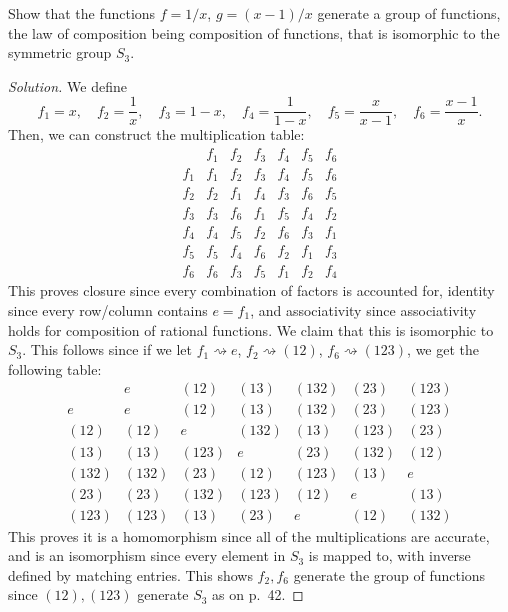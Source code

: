 \documentclass[12pt]{article}
\theoremstyle{remark}
\begin{document}
\begin{problem}
  Show that the functions $f = 1/x$, $g = (x-1)/x$ generate a group of functions, the law of composition being composition of functions, that is isomorphic to the symmetric group $S_3$.
\end{problem}
\begin{proof}[Solution]
  We define
  \begin{equation*}
    f_1 = x, \quad f_2 = \frac{1}{x}, \quad f_3 = 1 - x, \quad f_4 = \frac{1}{1-x}, \quad f_5 = \frac{x}{x-1}, \quad f_6 = \frac{x-1}{x}.
  \end{equation*}
  Then, we can construct the multiplication table:
  \begin{equation*}
    \begin{array}{c|cccccc}
          & f_1 & f_2 & f_3 & f_4 & f_5 & f_6\\
      \hline
      f_1 & f_1 & f_2 & f_3 & f_4 & f_5 & f_6\\
      f_2 & f_2 & f_1 & f_4 & f_3 & f_6 & f_5\\
      f_3 & f_3 & f_6 & f_1 & f_5 & f_4 & f_2\\
      f_4 & f_4 & f_5 & f_2 & f_6 & f_3 & f_1\\
      f_5 & f_5 & f_4 & f_6 & f_2 & f_1 & f_3\\
      f_6 & f_6 & f_3 & f_5 & f_1 & f_2 & f_4
    \end{array}
  \end{equation*}
  This proves closure since every combination of factors is accounted for, identity since every row/column contains $e = f_1$, and associativity since associativity holds for composition of rational functions. We claim that this is isomorphic to $S_3$. This follows since if we let $f_1 \rightsquigarrow e$, $f_2 \rightsquigarrow (12)$, $f_6 \rightsquigarrow (123)$, we get the following table:
  \begin{equation*}
    \begin{array}{c|cccccc}
             & e      & (12)   & (13)   & (132)  & (23)   & (123)\\
      \hline
      e      & e      & (12)   & (13)   & (132)  & (23)   & (123)\\
      (12)   & (12)   & e      & (132)  & (13)   & (123)  & (23) \\
      (13)   & (13)   & (123)  & e      & (23)   & (132)  & (12) \\
      (132)  & (132)  & (23)   & (12)   & (123)  & (13)   & e    \\
      (23)   & (23)   & (132)  & (123)  & (12)   & e      & (13) \\
      (123)  & (123)  & (13)   & (23)   & e      & (12)   & (132)
    \end{array}
  \end{equation*}
  This proves it is a homomorphism since all of the multiplications are accurate, and is an isomorphism since every element in $S_3$ is mapped to, with inverse defined by matching entries. This shows $f_2,f_6$ generate the group of functions since $(12),(123)$ generate $S_3$ as on p.~42.
\end{proof}
\end{document}
